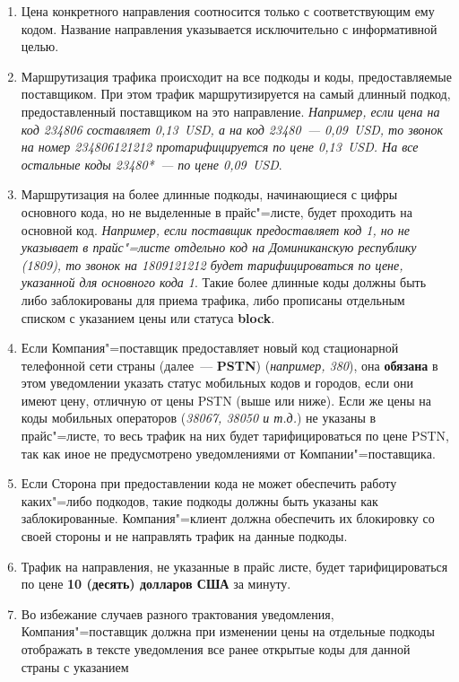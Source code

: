 \begin{Form}
\begin{enumerate}[label=\thesection.\arabic*.]
  \item \label{enu:2.2-ru}Цена конкретного направления соотносится только с соответствующим
    ему кодом. Название направления указывается исключительно с информативной
    целью.
  \item Маршрутизация трафика происходит на все подкоды и коды, предоставляемые
    поставщиком. При этом трафик маршрутизируется на самый длинный подкод,
    предоставленный поставщиком на это направление. \textit{Например, если цена
    на код 234806 составляет 0,13~USD, а на код 23480~---
    0,09~USD, то звонок на номер 234806121212 протарифицируется
    по цене 0,13~USD. На все остальные коды 23480{*}~--- по цене
    0,09~USD}.
  \item Маршрутизация на более длинные подкоды, начинающиеся с цифры основного
    кода, но не выделенные в прайс"=листе, будет проходить на основной
    код. \textit{Например, если поставщик предоставляет код 1, но не
    указывает в прайс"=листе отдельно код на Доминиканскую республику (1809),
    то звонок на 1809121212 будет тарифицироваться по цене, указанной
    для основного кода 1}. Такие более длинные коды должны быть
    либо заблокированы для приема трафика, либо прописаны отдельным списком
    с указанием цены или статуса \textbf{\flqq{}block\frqq{}}.
  \item Если Компания"=поставщик предоставляет новый код стационарной телефонной
    сети страны (далее~---\textbf{ \flqq{}PSTN\frqq{}}) (\textit{например, 380}),
    она \textbf{обязана} в этом уведомлении указать статус мобильных кодов и городов,
    если они имеют цену, отличную от цены PSTN (выше или ниже). Если же
    цены на коды мобильных операторов (\textit{38067, 38050
    и т.д.}) не указаны в прайс"=листе, то весь трафик на них будет тарифицироваться
    по цене PSTN, так как иное не предусмотрено уведомлениями от Компании"=поставщика.
  \item Если Сторона при предоставлении кода не может обеспечить работу каких"=либо
    подкодов, такие подкоды должны быть указаны как заблокированные. Компания"=клиент
    должна обеспечить их блокировку со своей стороны и не направлять трафик
    на данные подкоды.
  \item Трафик на направления, не указанные в прайс листе, будет тарифицироваться
    по цене \textbf{10 (десять) долларов США} за минуту.
  \item Во избежание случаев разного трактования уведомления, Компания"=поставщик
    должна при изменении цены на отдельные подкоды отображать в тексте
    уведомления все ранее открытые коды для данной страны с указанием

\end{enumerate}
\end{Form}
